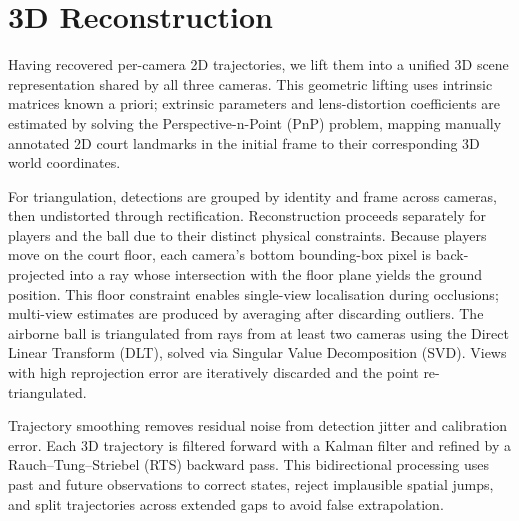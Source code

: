 \section{3D Reconstruction}\label{sec:reconstruction}

Having recovered per-camera 2D trajectories, we lift them into a unified 3D scene representation shared by all three cameras.
This geometric lifting uses intrinsic matrices known a priori; extrinsic parameters and lens-distortion coefficients are estimated by solving the Perspective-n-Point (PnP) problem, mapping manually annotated 2D court landmarks in the initial frame to their corresponding 3D world coordinates.

For triangulation, detections are grouped by identity and frame across cameras, then undistorted through rectification.
Reconstruction proceeds separately for players and the ball due to their distinct physical constraints.
Because players move on the court floor, each camera's bottom bounding-box pixel is back-projected into a ray whose intersection with the floor plane yields the ground position.
This floor constraint enables single-view localisation during occlusions; multi-view estimates are produced by averaging after discarding outliers.
The airborne ball is triangulated from rays from at least two cameras using the Direct Linear Transform (DLT), solved via Singular Value Decomposition (SVD).
Views with high reprojection error are iteratively discarded and the point re-triangulated.

Trajectory smoothing removes residual noise from detection jitter and calibration error.
Each 3D trajectory is filtered forward with a Kalman filter and refined by a Rauch--Tung--Striebel (RTS) backward pass.
This bidirectional processing uses past and future observations to correct states, reject implausible spatial jumps, and split trajectories across extended gaps to avoid false extrapolation.


